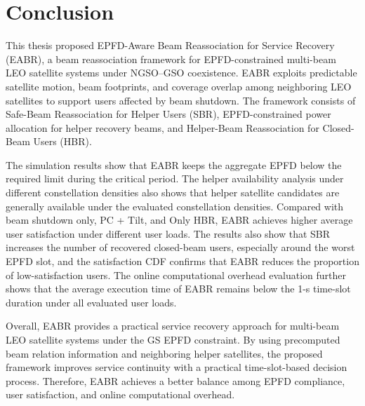 \section{Conclusion}
\label{sec:conclusion}

This thesis proposed EPFD-Aware Beam Reassociation for Service Recovery (EABR), a beam reassociation framework for EPFD-constrained multi-beam LEO satellite systems under NGSO--GSO coexistence. EABR exploits predictable satellite motion, beam footprints, and coverage overlap among neighboring LEO satellites to support users affected by beam shutdown. The framework consists of Safe-Beam Reassociation for Helper Users (SBR), EPFD-constrained power allocation for helper recovery beams, and Helper-Beam Reassociation for Closed-Beam Users (HBR).

The simulation results show that EABR keeps the aggregate EPFD below the required limit during the critical period. The helper availability analysis under different constellation densities also shows that helper satellite candidates are generally available under the evaluated constellation densities. Compared with beam shutdown only, PC + Tilt, and Only HBR, EABR achieves higher average user satisfaction under different user loads. The results also show that SBR increases the number of recovered closed-beam users, especially around the worst EPFD slot, and the satisfaction CDF confirms that EABR reduces the proportion of low-satisfaction users. The online computational overhead evaluation further shows that the average execution time of EABR remains below the 1-s time-slot duration under all evaluated user loads.

Overall, EABR provides a practical service recovery approach for multi-beam LEO satellite systems under the GS EPFD constraint. By using precomputed beam relation information and neighboring helper satellites, the proposed framework improves service continuity with a practical time-slot-based decision process. Therefore, EABR achieves a better balance among EPFD compliance, user satisfaction, and online computational overhead.